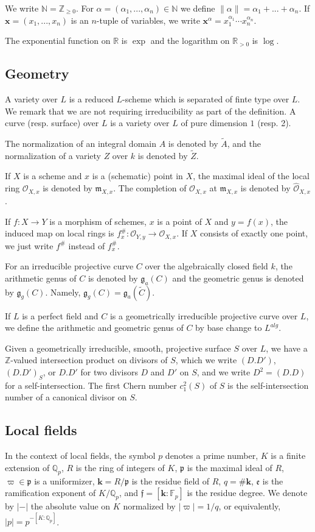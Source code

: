 \documentclass[11pt]{amsart}
\theoremstyle{remark}
\numberwithin{equation}{section}
\newcommand{\pfrak}{\mathfrak{p}}
\newcommand{\gfrak}{\mathfrak{g}}
\newcommand{\mfrak}{\mathfrak{m}}
\newcommand{\efrak}{\mathfrak{e}}
\newcommand{\ffrak}{\mathfrak{f}}
\newcommand{\Ocal}{\mathscr{O}}
\newcommand{\Z}{\mathbb{Z}}
\newcommand{\F}{\mathbb{F}}
\newcommand{\Q}{\mathbb{Q}}
\newcommand{\R}{\mathbb{R}}
\newcommand{\N}{\mathbb{N}}
\newcommand{\kk}{\mathbf{k}}
\newcommand{\xx}{\mathbf{x}}
\begin{document}
We write $\N=\Z_{\ge 0}$. For $\alpha=(\alpha_1,...,\alpha_n)\in \N$ we define $\|\alpha\|=\alpha_1+...+\alpha_n$. If $\xx=(x_1,...,x_n)$ is an $n$-tuple of variables, we write $\xx^{\alpha}=x_1^{\alpha_1}\cdots x_n^{\alpha_n}$. 


The exponential function on $\R$ is $\exp$ and the logarithm on $\R_{>0}$ is $\log$.
\subsection{Geometry}\label{notationGeo} A variety over $L$ is a reduced $L$-scheme which is separated of finte type over $L$. We remark that we are not requiring irreducibility as part of the definition. A curve (resp. surface) over $L$ is a variety over $L$ of pure dimension $1$ (resp. 2). 

The normalization of an integral domain $A$ is denoted by $\widetilde{A}$, and the normalization of a variety $Z$ over $k$ is denoted by $\widetilde{Z}$. 

If $X$ is a scheme and $x$ is a (schematic) point in $X$, the maximal ideal of the local ring $\Ocal_{X,x}$ is denoted by $\mfrak_{X,x}$. The completion of $\Ocal_{X,x}$ at $\mfrak_{X,x}$ is denoted by $\widehat{\Ocal}_{X,x}$. 

If $f:X\to Y$ is a morphism of schemes, $x$ is a point of $X$ and $y=f(x)$, the induced map on local rings is $f^\#_x : \Ocal_{Y,y}\to \Ocal_{X,x}$. If $X$ consists of exactly one point, we just write $f^\#$ instead of $f^\#_x$.


For an irreducible projective curve $C$ over the algebraically closed field $k$, the arithmetic genus of $C$ is denoted by $\gfrak_a(C)$ and the geometric genus is denoted by $\gfrak_g(C)$. Namely, $\gfrak_g(C)=\gfrak_a(\widetilde{C})$. 

If $L$ is a perfect field and $C$ is a geometrically irreducible projective curve over $L$, we define the arithmetic and geometric genus of $C$ by base change to $L^{alg}$.

Given a geometrically irreducible, smooth, projective surface $S$ over $L$, we have a $\Z$-valued intersection product on divisors of $S$, which we write $(D.D')$, $(D.D')_S$, or $D.D'$ for two divisors $D$ and $D'$ on $S$, and we write $D^2=(D.D)$ for a self-intersection. The first Chern number $c_1^2(S)$ of $S$ is the self-intersection number of a canonical divisor on $S$. 

\subsection{Local fields}\label{NotationLoc} In the context of local fields, the symbol $p$ denotes a prime number, $K$ is a finite extension of $\Q_p$, $R$ is the ring of integers of $K$, $\pfrak$ is the maximal ideal of $R$, $\varpi\in \pfrak$ is a uniformizer, $\kk=R/\pfrak$ is the residue field of $R$, $q=\# \kk$, $\efrak$ is the ramification exponent of $K/\Q_p$, and $\ffrak=[\kk : \F_p]$ is the residue degree. We denote by $|-|$ the absolute value on $K$ normalized by $|\varpi|=1/q$, or equivalently, $|p|=p^{-[K:\Q_p]}$.
\end{document}
